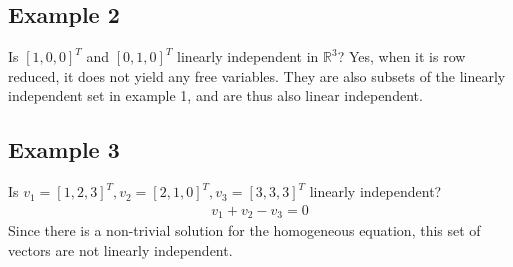 \documentclass{article}
\theoremstyle{mytheoremstyle}
\theoremstyle{mytheoremstyle}
\theoremstyle{myproblemstyle}
\begin{document}
    \subsection*{Example 2}
    Is $[1, 0, 0]^T$ and $[0, 1, 0]^T$ linearly independent in $\mathbb{R}^3$?
    Yes, when it is row reduced, it does not yield any free variables. They are
    also subsets of the linearly independent set in example 1, and are thus also
    linear independent.

    \subsection*{Example 3}
    Is $v_1=[1, 2, 3]^T, v_2=[2, 1, 0]^T, v_3=[3, 3, 3]^T$ linearly independent?
    \begin{align*}
        v_1 + v_2 - v_3 = 0
    \end{align*}
    Since there is a non-trivial solution for the homogeneous equation, this set
    of vectors are not linearly independent.
\end{document}
